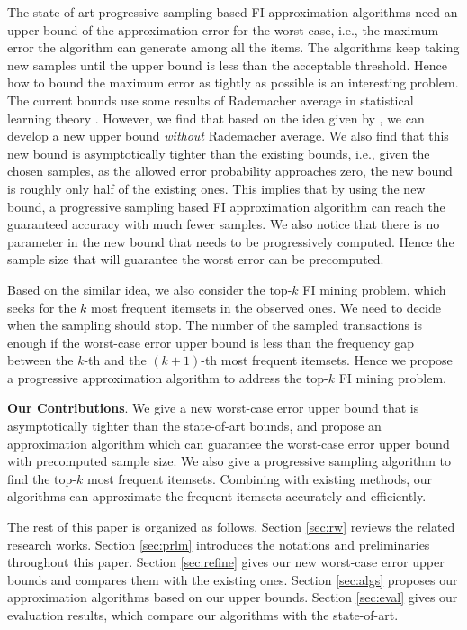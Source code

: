 \documentclass{article}
\begin{document}
The state-of-art progressive sampling based FI approximation algorithms \cite{RU15} need an upper bound of the approximation error for the worst case, i.e., the maximum error the algorithm can generate among all the items. The algorithms keep taking new samples until the upper bound is less than the acceptable threshold. Hence how to bound the maximum error as tightly as possible is an interesting problem. The current bounds use some results of Rademacher average in statistical learning theory \cite{Vap98,Vap13,BBL04,BBL05}. 
However, we find that based on the idea given by \cite{BBL04}, we can develop a new upper bound \emph{without} Rademacher average. 
We also find that this new bound is asymptotically tighter than the existing bounds, i.e., given the chosen samples, as the allowed error probability approaches zero, the new bound is roughly only half of the existing ones. This implies that by using the new bound, a progressive sampling based FI approximation algorithm can reach the guaranteed accuracy with much fewer samples. We also notice that there is no parameter in the new bound that needs to be progressively computed. Hence the sample size that will guarantee the worst error can be precomputed.

Based on the similar idea, we also consider the top-$k$ FI mining problem, which seeks for the $k$ most frequent itemsets in the observed ones. We need to decide when the sampling should stop. The number of the sampled transactions is enough if the worst-case error upper bound is less than the frequency gap between the $k$-th and the $(k+1)$-th most frequent itemsets. Hence we propose a progressive approximation algorithm to address the top-$k$ FI mining problem.

{\bf Our Contributions}. We give a new worst-case error upper bound that is asymptotically tighter than the state-of-art bounds, and propose an approximation algorithm which can guarantee the worst-case error upper bound with precomputed sample size. We also give a progressive sampling algorithm to find the top-$k$ most frequent itemsets. Combining with existing methods, our algorithms can approximate the frequent itemsets accurately and efficiently.

The rest of this paper is organized as follows. Section \ref{sec:rw} reviews the related research works. Section \ref{sec:prlm} introduces the notations and preliminaries throughout this paper. Section \ref{sec:refine} gives our new worst-case error upper bounds and compares them with the existing ones. Section \ref{sec:algs} proposes our approximation algorithms based on our upper bounds. Section \ref{sec:eval} gives our evaluation results, which compare our algorithms with the state-of-art.
\end{document}
